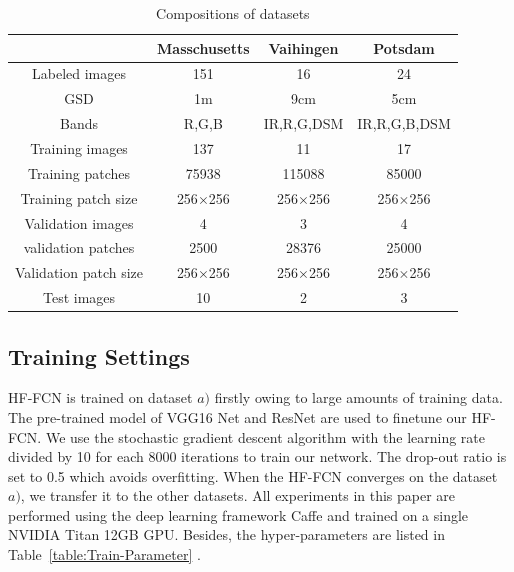 \begin{table}
\setlength{\belowcaptionskip}{-2cm} 
 \centering
 \caption{Compositions of datasets}
 \label{table:dataset-composition}
 \begin{tabular}{c|ccc}
\hline
& Masschusetts & Vaihingen & Potsdam\\  \hline
Labeled images & 151& 16 &24\\ \hline
GSD & 1m & 9cm & 5cm\\ \hline
Bands & R,G,B & IR,R,G,DSM & IR,R,G,B,DSM\\ \hline
Training images &137 & 11 & 17\\ \hline
Training patches&75938 &115088 &85000\\ \hline
Training patch size& 256$\times$256 & 256$\times$256 & 256$\times$256\\ \hline
Validation images & 4 & 3 & 4\\ \hline
validation patches &2500 & 28376 &25000 \\\hline
Validation patch size & 256$\times$256 & 256$\times$256 & 256$\times$256\\ \hline
Test images & 10 & 2 & 3\\ \hline
\end{tabular}
\end {table}



\subsection{Training Settings}
HF-FCN is trained on dataset ${a)}$ firstly owing to large amounts of training data. The pre-trained model of VGG16 Net and ResNet are used to finetune our HF-FCN. We use the stochastic gradient descent algorithm with the learning rate divided by 10 for each 8000 iterations to train our network. The drop-out ratio is set to 0.5 which avoids overfitting. When the HF-FCN converges on the dataset ${a)}$, we transfer it to the other datasets. All experiments in this paper are performed using the deep learning framework Caffe and trained on a single NVIDIA Titan 12GB GPU. Besides, the hyper-parameters are listed in Table~\ref{table:Train-Parameter} .


